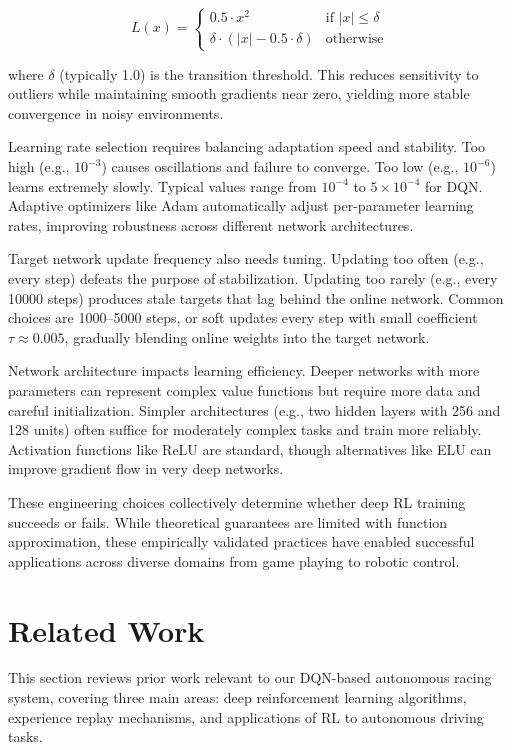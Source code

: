 \begin{equation}
L(x) = 
\begin{cases}
0.5 \cdot x^2 & \text{if } |x| \leq \delta \\
\delta \cdot (|x| - 0.5 \cdot \delta) & \text{otherwise}
\end{cases}
\end{equation}

where $\delta$ (typically 1.0) is the transition threshold. This reduces sensitivity to outliers while maintaining smooth gradients near zero, yielding more stable convergence in noisy environments.

Learning rate selection requires balancing adaptation speed and stability. Too high (e.g., $10^{-3}$) causes oscillations and failure to converge. Too low (e.g., $10^{-6}$) learns extremely slowly. Typical values range from $10^{-4}$ to $5 \times 10^{-4}$ for DQN. Adaptive optimizers like Adam automatically adjust per-parameter learning rates, improving robustness across different network architectures.

Target network update frequency also needs tuning. Updating too often (e.g., every step) defeats the purpose of stabilization. Updating too rarely (e.g., every 10000 steps) produces stale targets that lag behind the online network. Common choices are 1000--5000 steps, or soft updates every step with small coefficient $\tau \approx 0.005$, gradually blending online weights into the target network.

Network architecture impacts learning efficiency. Deeper networks with more parameters can represent complex value functions but require more data and careful initialization. Simpler architectures (e.g., two hidden layers with 256 and 128 units) often suffice for moderately complex tasks and train more reliably. Activation functions like ReLU are standard, though alternatives like ELU can improve gradient flow in very deep networks.

These engineering choices collectively determine whether deep RL training succeeds or fails. While theoretical guarantees are limited with function approximation, these empirically validated practices have enabled successful applications across diverse domains from game playing to robotic control.


\section{Related Work}

This section reviews prior work relevant to our DQN-based autonomous racing system, covering three main areas: deep reinforcement learning algorithms, experience replay mechanisms, and applications of RL to autonomous driving tasks.

